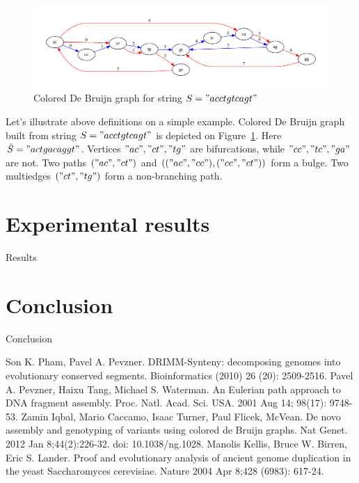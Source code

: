 \documentclass[a4paper,12pt]{scrartcl}
\begin{document}
\begin{figure}
	\includegraphics[scale = 0.50]{graph3.pdf}
	\small \caption{Colored De Bruijn graph for string \(S = "acctgtcagt" \) }
	\label{ColoredDeBruijn}
\end{figure}

Let's illustrate above definitions on a simple example. Colored De Bruijn graph built from string \(S = "acctgtcagt"\)
is depicted on Figure~\ref{ColoredDeBruijn}. Here \(\bar{S} = "actgacaggt"\). Vertices \("ac", "ct", "tg"\) are 
bifurcations, while \("cc", "tc", "ga"\) are not. Two paths \(("ac", "ct")\) and \((("ac", "cc"), ("cc", "ct"))\) form a bulge.
Two multiedges \(("ct", "tg")\) form a non-branching path.

\section{Experimental results}
Results
\section{Conclusion}
Conclusion

\begin{thebibliography}{9}
	Son K. Pham, Pavel A. Pevzner.
	DRIMM-Synteny: decomposing genomes into evolutionary conserved segments.
	Bioinformatics (2010)  26  (20):  2509-2516.
	Pavel A. Pevzner, Haixu Tang, Michael S. Waterman.
	An Eulerian path approach to DNA fragment assembly.
	Proc. Natl. Acad. Sci. USA. 2001 Aug 14; 98(17): 9748-53.
	Zamin Iqbal, Mario Caccamo, Isaac Turner, Paul Flicek, McVean.
	De novo assembly and genotyping of variants using colored de Bruijn graphs.
	Nat Genet. 2012 Jan 8;44(2):226-32. doi: 10.1038/ng.1028.
	Manolis Kellis, Bruce W. Birren, Eric S. Lander.
	Proof and evolutionary analysis of ancient genome duplication in the yeast Saccharomyces cerevisiae.
	Nature 2004 Apr 8;428 (6983): 617-24.
\end{thebibliography}
\end{document}

